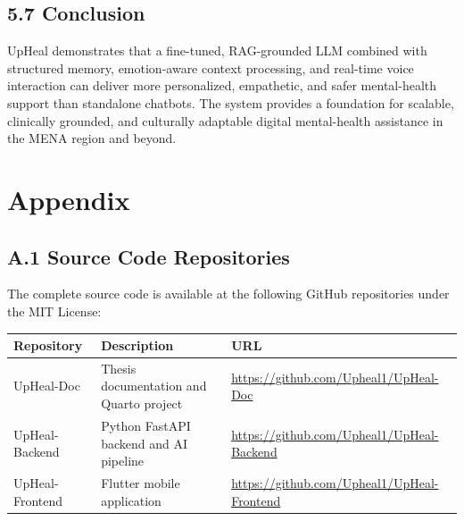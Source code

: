 \documentclass[
  letterpaper,
  12pt,
  a4paper,
  openany]{report}
\newcounter{none} %
\begin{document}
\section{5.7 Conclusion}\label{conclusion}

UpHeal demonstrates that a fine-tuned, RAG-grounded LLM combined with
structured memory, emotion-aware context processing, and real-time voice
interaction can deliver more personalized, empathetic, and safer
mental-health support than standalone chatbots. The system provides a
foundation for scalable, clinically grounded, and culturally adaptable
digital mental-health assistance in the MENA region and beyond.

\cleardoublepage
{}
{}
\appendix

\chapter{Appendix}\label{sec-appendix}

\section{A.1 Source Code
Repositories}\label{a.1-source-code-repositories}

The complete source code is available at the following GitHub
repositories under the MIT License:

{\def\LTcaptype{none} %
\begin{longtable}[]{@{}
  >{\raggedright\arraybackslash}p{}
  >{\raggedright\arraybackslash}p{}
  >{\raggedright\arraybackslash}p{}@{}}
\toprule\noalign{}
\begin{minipage}[b]{\linewidth}\raggedright
Repository
\end{minipage} & \begin{minipage}[b]{\linewidth}\raggedright
Description
\end{minipage} & \begin{minipage}[b]{\linewidth}\raggedright
URL
\end{minipage} \\
\midrule\noalign{}
\endhead
\bottomrule\noalign{}
\endlastfoot
UpHeal-Doc & Thesis documentation and Quarto project &
\url{https://github.com/Upheal1/UpHeal-Doc} \\
UpHeal-Backend & Python FastAPI backend and AI pipeline &
\url{https://github.com/Upheal1/UpHeal-Backend} \\
UpHeal-Frontend & Flutter mobile application &
\url{https://github.com/Upheal1/UpHeal-Frontend} \\
\end{longtable}
}
\end{document}
